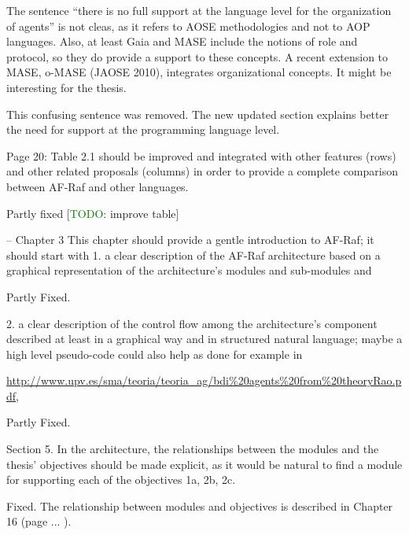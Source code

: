 \documentclass{article}
\newcommand{\todo}[1]{[\textcolor{green}{TODO}: #1]}
\newenvironment{them}{\noindent\begingroup\color{blue}}{\endgroup\par}
\begin{document}
\begin{them}

The sentence “there is no full support at the language level for the
organization of agents” is not cleas, as it refers to AOSE methodologies and
not to AOP languages. Also, at least Gaia and MASE include the notions of role
and protocol, so they do provide a support to these concepts. A recent
extension to MASE, o-MASE (JAOSE 2010), integrates organizational concepts. It
might be interesting for the thesis.

\end{them}
This confusing sentence was removed. The new updated section explains better
the need for support at the programming language level. 

\begin{them}

Page 20:
Table 2.1 should be improved and integrated with other features (rows) and
other related proposals (columns) in order to provide a complete comparison
between AF-Raf and other languages.

\end{them}
Partly fixed
\todo{improve table}

\begin{them}

-- Chapter 3
This chapter should provide a gentle introduction to AF-Raf; it should start
with 1. a clear description of the AF-Raf architecture based on a graphical
representation of the architecture's modules and sub-modules and

\end{them}
Partly Fixed. 

\begin{them}

2. a clear description of the control flow among the architecture's component
described at least in a graphical way and in structured natural language; maybe
a high level pseudo-code could also help as done for example in

\url{http://www.upv.es/sma/teoria/teoria_ag/bdi\%20agents\%20from\%20theoryRao.pdf},
\end{them}
Partly Fixed. 

\begin{them}

Section 5.
In the architecture, the relationships between the modules and the thesis'
objectives should be made explicit, as it would be natural to find a module for
supporting each of the objectives 1a, 2b, 2c.

\end{them}
Fixed. The relationship between modules and objectives is described in Chapter
16 (page ... ).
\end{document}
